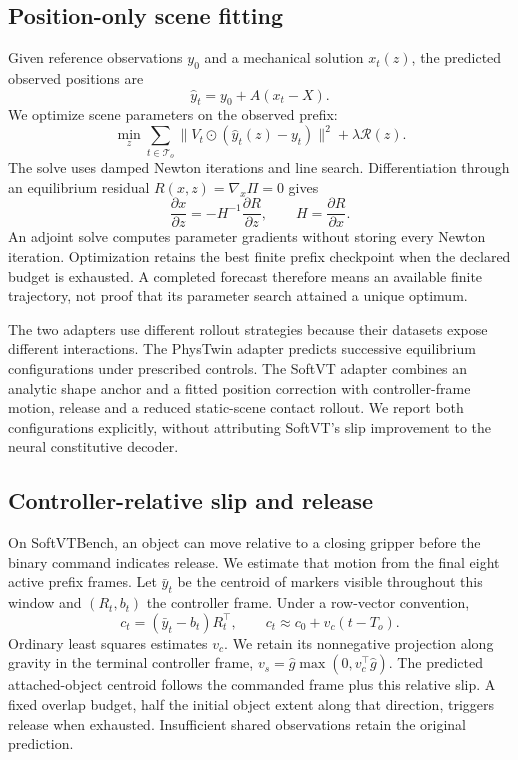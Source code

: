 \documentclass[10pt,twocolumn,letterpaper]{article}
\begin{document}
\subsection{Position-only scene fitting}
Given reference observations $y_0$ and a mechanical solution $x_t(z)$, the predicted observed positions are
\begin{equation}
\hat y_t=y_0+A(x_t-X).
\end{equation}
We optimize scene parameters on the observed prefix:
\begin{equation}\label{eq:fit}
\min_z\sum_{t\in\mathcal T_o}\|V_t\odot(\hat y_t(z)-y_t)\|^2+\lambda\mathcal R(z).
\end{equation}
The solve uses damped Newton iterations and line search. Differentiation through an equilibrium residual $R(x,z)=\nabla_x\Pi=0$ gives
\begin{equation}
\frac{\partial x}{\partial z}=-H^{-1}\frac{\partial R}{\partial z},\qquad H=\frac{\partial R}{\partial x}.
\end{equation}
An adjoint solve computes parameter gradients without storing every Newton iteration. Optimization retains the best finite prefix checkpoint when the declared budget is exhausted. A completed forecast therefore means an available finite trajectory, not proof that its parameter search attained a unique optimum.

The two adapters use different rollout strategies because their datasets expose different interactions. The PhysTwin adapter predicts successive equilibrium configurations under prescribed controls. The SoftVT adapter combines an analytic shape anchor and a fitted position correction with controller-frame motion, release and a reduced static-scene contact rollout. We report both configurations explicitly, without attributing SoftVT's slip improvement to the neural constitutive decoder.

\subsection{Controller-relative slip and release}
On SoftVTBench, an object can move relative to a closing gripper before the binary command indicates release. We estimate that motion from the final eight active prefix frames. Let $\bar y_t$ be the centroid of markers visible throughout this window and $(R_t,b_t)$ the controller frame. Under a row-vector convention,
\begin{equation}
c_t=(\bar y_t-b_t)R_t^\top,\qquad c_t\approx c_0+v_c(t-T_o).
\end{equation}
Ordinary least squares estimates $v_c$. We retain its nonnegative projection along gravity in the terminal controller frame, $v_s=\hat g\max(0,v_c^\top\hat g)$. The predicted attached-object centroid follows the commanded frame plus this relative slip. A fixed overlap budget, half the initial object extent along that direction, triggers release when exhausted. Insufficient shared observations retain the original prediction.
\end{document}
